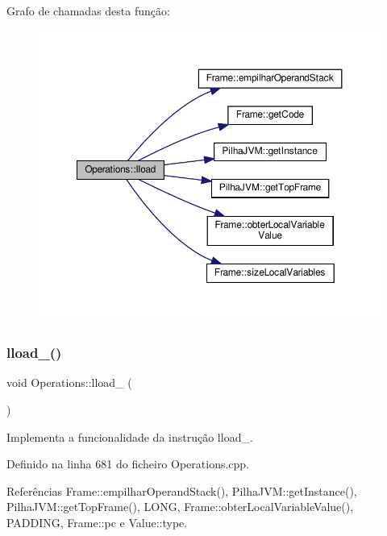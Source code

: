 Grafo de chamadas desta função\+:
\nopagebreak
\begin{figure}[H]
\begin{center}
\leavevmode
\includegraphics[width=350pt]{classOperations_abd9d44b782cc5ae7d7985a424a0985c6_cgraph}
\end{center}
\end{figure}
\mbox{\label{classOperations_a556b64c0764f7a654a30540eb355aab3}} 
\subsubsection{\texorpdfstring{lload\+\_()}{lload\_0()}}
{\footnotesize\ttfamily void Operations\+::lload\+\_ (\begin{DoxyParamCaption}{ }\end{DoxyParamCaption})\hspace{0.3cm}{\ttfamily [private]}}



Implementa a funcionalidade da instrução lload\+\_. 



Definido na linha 681 do ficheiro Operations.\+cpp.



Referências Frame\+::empilhar\+Operand\+Stack(), Pilha\+J\+V\+M\+::get\+Instance(), Pilha\+J\+V\+M\+::get\+Top\+Frame(), L\+O\+NG, Frame\+::obter\+Local\+Variable\+Value(), P\+A\+D\+D\+I\+NG, Frame\+::pc e Value\+::type.



